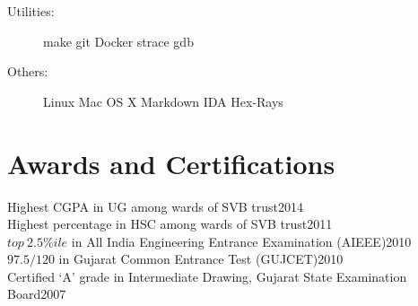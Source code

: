\documentclass[margin]{res}
\begin{document}
\begin{resume}
\begin{description}
    \item[Utilities:]
        make \textbullet{}
        git \textbullet{}
        Docker \textbullet{}
        strace \textbullet{}
        gdb

    \item[Others:]
        Linux \textbullet{}
        Mac OS X \textbullet{}
        Markdown \textbullet{}
        IDA Hex-Rays
\end{description}

\section{Awards and Certifications}
Highest CGPA in UG among wards of SVB trust\hfill 2014\\
Highest percentage in HSC among wards of SVB trust\hfill 2011\\
$top\ 2.5\%ile$ in All India Engineering Entrance Examination (AIEEE)\hfill 2010\\
$97.5 / 120$ in Gujarat Common Entrance Test (GUJCET)\hfill 2010\\
Certified `A' grade in Intermediate Drawing, Gujarat State Examination Board\hfill 2007\\


\end{resume} 
\end{document}
